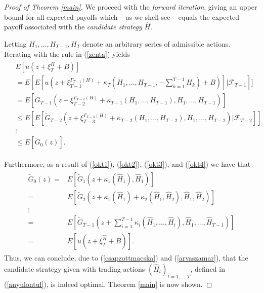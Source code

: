 \documentclass[a4paper]{article}
\begin{document}
\begin{proof}[Proof of Theorem \ref{main}]
We proceed with the \emph{forward iteration}, giving an upper bound for all expected payoffs which -- 
as we shell see -- equals the expected payoff associated with the \emph{candidate strategy} $\hat H$.


Letting $H_1, \ldots, H_{T-1}, H_T$ denote an arbitrary series of admissible actions. Iterating with the rule in (\ref{zenta}) yields
\begin{align}\label{arvaszamar}
\begin{split}
&E[u(z + \xi_T^{H} + B)]
\\
&=
E[ E[u(z + \xi_{T-1}^{\Gamma_{T-1}(H)} + \kappa_T(H_1, \ldots, H_{T-1}, - \sum_{k = 1}^{T-1} H_{k}) + B)] \vert \mathcal{F}_{T-1}]]
\\
&=
E[ \tilde{G}_{T-1}(z + \xi_{T-2}^{\Gamma_{T-2}(H)} + \kappa_{T-1}(H_1, \ldots, H_{T-1}), H_1, \ldots, H_{T-1}) ]
\\
& 
\leq
E[ E[ \tilde{G}_{T-2}(z + \xi_{T-3}^{\Gamma_{T-3}(H)} + \kappa_{T-2}(H_1, \ldots, H_{T-2}), H_1, \ldots, H_{T-2}) \vert \mathcal{F}_{T-2} ] ]
\\
& \vdots
\\
&\phantom{} \leq  E[\tilde{G}_0(z)].
\end{split}
\end{align}


Furthermore, as a result of (\ref{okt1}), (\ref{okt2}), (\ref{okt3}), and (\ref{okt4}) we have that 
\begin{align}\label{csapzottmacska}
\begin{split}
\tilde{G}_0(z) =& E[ \tilde{G}_1(z + \kappa_1(\hat H_1), \hat H_1)]
\\
=&  E[\tilde{G}_2(z + \kappa_1(\hat H_1) + \kappa_2(\hat H_1, \hat H_2), \hat H_1, \hat H_2)]
\\
\vdots&
\\
=& E[\tilde{G}_{T-1}(z + \sum_{i = 1}^{T-1}\kappa_{i}(\hat H_1, \ldots, \hat H_{i}), \hat H_1, \ldots, \hat H_{T-1})]
\\
=& E[u(z + \xi_T^{\hat H} + B)].
\end{split}
\end{align}
Thus, we can conclude, due to (\ref{csapzottmacska}) and (\ref{arvaszamar}), that the candidate 
strategy given with trading actions $(\hat H_t)_{t = 1, \ldots, T}$, defined in (\ref{anyulontul}), is indeed optimal. 
Theorem \ref{main} is now shown.
\end{proof}
\end{document}
